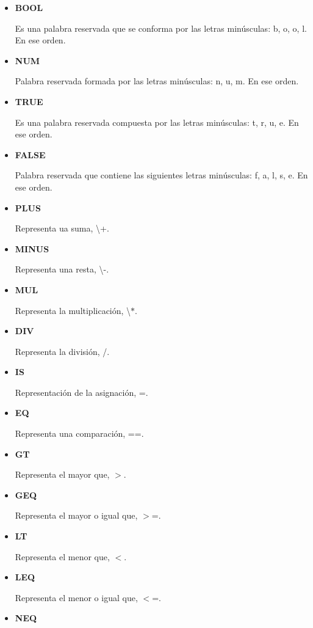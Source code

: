 \documentclass[\main/MemoriaPL.tex]{subfiles}
\begin{document}
\begin{itemize}
      \item \textbf{BOOL}
            \par
            Es una palabra reservada que se conforma por las letras minúsculas: b, o, o, l. En ese orden.
      \item \textbf{NUM}
            \par
            Palabra reservada formada por las letras minúsculas: n, u, m. En ese orden.
      \item \textbf{TRUE}
            \par
            Es una palabra reservada compuesta por las letras minúsculas: t, r, u, e. En ese orden.
      \item \textbf{FALSE}
            \par
            Palabra reservada que contiene las siguientes letras minúsculas: f, a, l, s, e. En ese orden.
      \item \textbf{PLUS}
            \par
            Representa ua suma, \textbackslash +.
      \item \textbf{MINUS}
            \par
            Representa una resta, \textbackslash -.
      \item \textbf{MUL}
            \par
            Representa la multiplicación, \textbackslash $\ast$.
      \item \textbf{DIV}
            \par
            Representa la división, /.
      \item \textbf{IS}
            \par
            Representación de la asignación, =.
      \item \textbf{EQ}
            \par
            Representa una comparación, ==.
      \item \textbf{GT}
            \par
            Representa el mayor que, $>$.
      \item \textbf{GEQ}
            \par
            Representa el mayor o igual que, $>$=.
      \item \textbf{LT}
            \par
            Representa el menor que, $<$.
      \item \textbf{LEQ}
            \par
            Representa el menor o igual que, $<$=.
      \item \textbf{NEQ}

\end{itemize}
\end{document}

